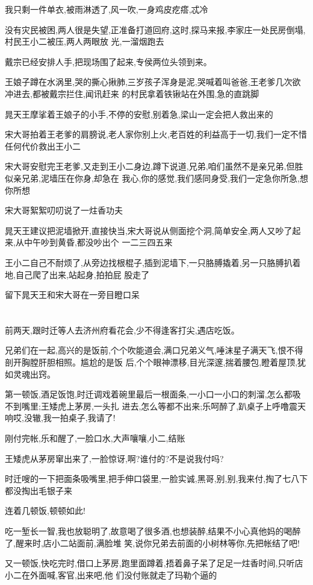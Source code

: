 ﻿\documentclass[12pt]{article}
\begin{document}
我只剩一件单衣,被雨淋透了,风一吹,一身鸡皮疙瘩,忒冷

没有灾民被困,两人很是失望,正准备打道回府,这时,探马来报,李家庄一处民房倒塌,村民王小二被压,两人两眼放
光,一溜烟跑去

戴宗已经安排人手,把现场围了起来,专侯两位头领到来。

王娘子蹲在水涡里,哭的撕心揪肺,三岁孩子浑身是泥,哭喊着叫爸爸,王老爹几次欲冲进去,都被戴宗拦住,闻讯赶来
的村民拿着铁锹站在外围,急的直跳脚

晁天王摩挲着王娘子的小手,不停的安慰,别着急,梁山一定会把人救出来的

宋大哥拍着王老爹的肩膀说,老人家你别上火,老百姓的利益高于一切,我们一定不惜任何代价救出王小二\dldots

宋大哥安慰完王老爹,又走到王小二身边,蹲下说道,兄弟,咱们虽然不是亲兄弟,但胜似亲兄弟,泥墙压在你身,却急在
我心,你的感觉,我们感同身受,我们一定急你所急,想你所想\dldots

宋大哥絮絮叨叨说了一炷香功夫\dldots

晁天王建议把泥墙掀开,直接快当,宋大哥说从侧面挖个洞,简单安全,两人又吵了起来,从中午吵到黄昏,都没吵出个
一二三四五来

王小二自己不耐烦了,从旁边找根棍子,插到泥墙下,一只胳膊撬着,另一只胳膊扒着地,自己爬了出来,站起身,拍拍屁
股走了

留下晁天王和宋大哥在一旁目瞪口呆\dldots

\section{}

前两天,跟时迁等人去济州府看花会,少不得逢客打尖,遇店吃饭。

兄弟们在一起,高兴的是饭前,个个吹能道会,满口兄弟义气,唾沫星子满天飞,恨不得剖开胸膛肝胆相照。尴尬的是饭
后,个个眼神漂移,目光深邃,揣着腰包,瞪着屋顶,犹如灵魂出窍。

第一顿饭,酒足饭饱,时迁调戏着碗里最后一根面条,一小口一小口的刺溜,怎么都吸不到嘴里;王矮虎上茅房,一头扎
进去,怎么等都不出来;乐呵醉了,趴桌子上呼噜震天响\dldots 哎,没辙,我一拍桌子,我请了!

刚付完帐,乐和醒了,一脸口水,大声嚷嚷,小二,结账\dldots

王矮虎从茅房窜出来了,一脸惊讶,啊?谁付的?不是说我付吗?

时迁嗖的一下把面条吸嘴里,把手伸口袋里,一脸实诚,黑哥,别,别,我来付,掏了七八下都没掏出毛银子来\dldots

连着几顿饭,顿顿如此!

吃一堑长一智,我也放聪明了,故意喝了很多酒,也想装醉,结果不小心真他妈的喝醉了,醒来时,店小二站面前,满脸堆
笑,说你兄弟去前面的小树林等你,先把帐结了吧!

又一顿饭,快吃完时,借口上茅房,跑里面蹲着,捂着鼻子呆了足足一炷香时间,只听店小二在外面喊,客官,出来吧,他
们没付账就走了\dldots 玛勒个逼的
\end{document}

